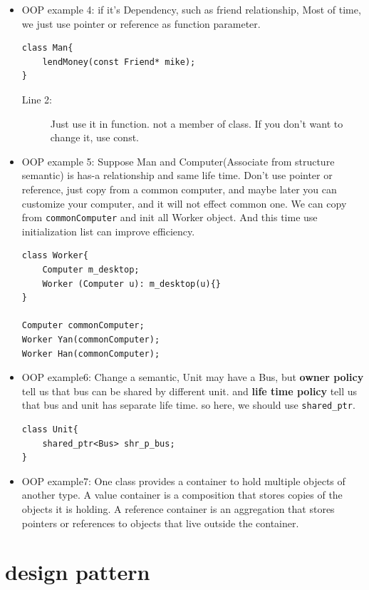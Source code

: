 \documentclass[a4paper,11pt,twoside]{book}
\begin{document}
\begin{itemize}
	\item OOP example 4: if it's Dependency,  such as friend relationship,  Most of time, we just use pointer or reference as function parameter.
\begin{lstlisting}[numbers=none]
class Man{
	lendMoney(const Friend* mike);
}

\end{lstlisting}
\begin{description}
	\item[Line 2:] Just use it in function. not a member of class. If you don't want to change it, use const.
\end{description}
	
	\item OOP example 5: Suppose Man and Computer(Associate from structure semantic) is has-a relationship and same life time. Don't use pointer or reference, just copy from a common computer, and maybe later you can customize your computer, and it will not effect common one.  We can copy from \texttt{commonComputer} and init all Worker object.  And this time use initialization list can improve efficiency.
\begin{lstlisting}[numbers=none]
class Worker{
	Computer m_desktop;
	Worker (Computer u): m_desktop(u){}
}
	
Computer commonComputer;
Worker Yan(commonComputer);
Worker Han(commonComputer);
\end{lstlisting}
	
	
	\item OOP example6:  Change a semantic,  Unit may have a Bus, but \textbf{owner policy} tell us that bus can be shared by different unit. and \textbf{life time policy} tell us that bus and unit has separate life time. so here, we should use \texttt{shared\_ptr}.
\begin{lstlisting}[numbers=none]
class Unit{
	shared_ptr<Bus> shr_p_bus;
}
\end{lstlisting}
	
	\item OOP example7: One class provides a container to hold multiple objects of another type. A value container is a composition that stores copies of the objects it is holding. A reference container is an aggregation that stores pointers or references to objects that live outside the container.
	
\end{itemize}


\section{design pattern}
\end{document}
